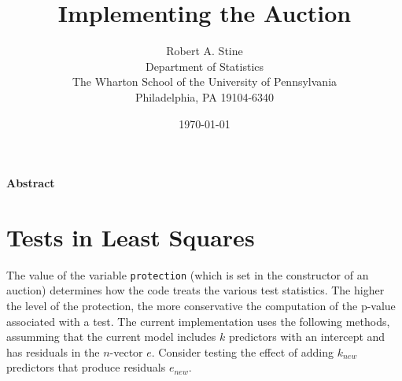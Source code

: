 \documentclass[12pt]{article}
\title{  
         Implementing the Auction
}
\author{
        Robert A. Stine                                      \\
        Department of Statistics                             \\
        The Wharton School of the University of Pennsylvania \\
        Philadelphia, PA 19104-6340                          \\
}
\date{\today}
\begin{document}
\maketitle 

\vspace{-0.5in} \centerline{\bf Abstract} 

\clearpage

\section{Tests in Least Squares} %

 The value of the variable {\tt protection} (which is set in the constructor of
 an auction) determines how the code treats the various test statistics.  The
 higher the level of the protection, the more conservative the computation of
 the p-value associated with a test.  The current implementation uses the
 following methods, assumming that the current model includes $k$ predictors
 with an intercept and has residuals in the $n$-vector $e$.  Consider testing
 the effect of adding $k_{new}$ predictors that produce residuals $e_{new}$.
\end{document}
